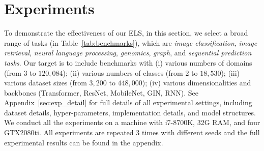 \documentclass{article} \usepackage{iclr2023_conference,times}
\newcommand{\ls}[0]{ELS\xspace}
\begin{document}
\vspace{-0.15cm}
\section{Experiments}\label{sec:exps}
\vspace{-0.15cm}

To demonstrate the effectiveness of our \ls, in this section, we select a broad range of tasks (in Table~\ref{tab:benchmarks}), which are \textit{image classification}, \textit{image retrieval}, \textit{neural language processing}, \textit{genomics}, \textit{graph}, and \textit{sequential prediction tasks}. Our target is to include benchmarks with (i) various numbers of domains (from $3$ to $120,084$); (ii) various numbers of classes (from $2$ to $18,530$); (iii) various dataset sizes (from $3,200$ to $448,000$); (iv) various dimensionalities and backbones (Transformer, ResNet, MobileNet, GIN, RNN). See Appendix~\ref{sec:exp_detail} for full details of all experimental settings, including dataset details, hyper-parameters, implementation details, and model structures. We conduct all the experiments on a machine with i7-8700K, 32G RAM, and four GTX2080ti. All experiments are repeated $3$ times with different seeds and the full experimental results can be found in the appendix.
\end{document}
